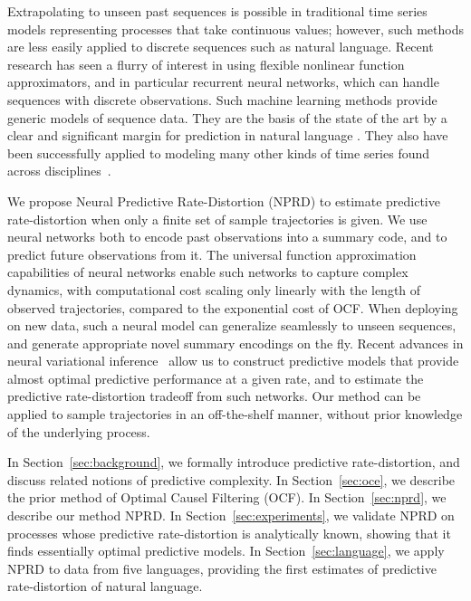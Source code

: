 \documentclass[entropy,article,submit,moreauthors,pdftex,10pt,a4paper]{Definitions/mdpi}
\begin{document}
Extrapolating to unseen past sequences is possible in traditional time series models representing processes that take continuous values; however, such methods are less easily applied to discrete sequences such as natural language.
Recent research has seen a flurry of interest in using flexible nonlinear function approximators, and in particular recurrent neural networks, which can handle sequences with discrete observations.
Such machine learning methods provide generic models of sequence data.
They are the basis of the state of the art by a clear and significant margin for prediction in natural language \citep{DBLP:journals/corr/JozefowiczVSSW16, merity2018analysis, dai2019transformer,takahashi2018cross}.
They also have been successfully applied to modeling many other kinds of time series found across disciplines~\citep{ogunmolu2016nonlinear,laptev2017time,meyer2018survey,hundman2018detecting,white2018forecasting,woo2018dynamic,sirignano2018universal,mohajerin2019multistep}. %

We propose Neural Predictive Rate-Distortion (NPRD) to estimate predictive rate-distortion when only a finite set of sample trajectories is given.
We use neural networks both to encode past observations into a summary code, and to predict future observations from it.
The universal function approximation capabilities of neural networks enable such networks to capture complex dynamics, with computational cost scaling only linearly with the length of observed trajectories, compared to the exponential cost of OCF.
When deploying on new data, such a neural model can generalize seamlessly to unseen sequences, and generate appropriate novel summary encodings on the fly.
Recent advances in neural variational inference~\citep{rezende-variational-2015,huang-neural-2018} allow us to construct predictive models that provide almost optimal predictive performance at a given rate, and to estimate the predictive rate-distortion tradeoff from such networks.
Our method can be applied to sample trajectories in an off-the-shelf manner, without prior knowledge of the underlying process.

In Section~\ref{sec:background}, we formally introduce predictive rate-distortion, and discuss related notions of predictive complexity.
In Section~\ref{sec:oce}, we describe the prior method of Optimal Causel Filtering (OCF).
In Section~\ref{sec:nprd}, we describe our method NPRD.
In Section~\ref{sec:experiments}, we validate NPRD on processes whose predictive rate-distortion is analytically known, showing that it finds essentially optimal predictive models.
In Section~\ref{sec:language}, we apply NPRD to data from five languages, providing the first estimates of predictive rate-distortion of natural language.
\end{document}
